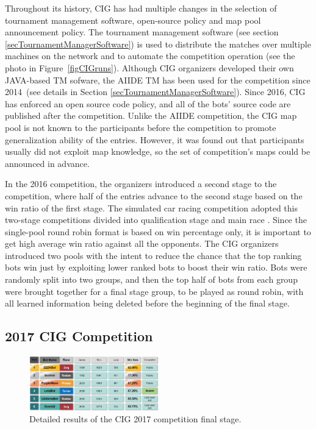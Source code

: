 Throughout its history, CIG has had multiple changes in the selection of tournament management software, open-source policy and map pool announcement policy. The tournament management software (see section \ref{secTournamentManagerSoftware}) is used to distribute the matches over multiple machines on the network and to automate the competition operation (see the photo in Figure~\ref{figCIGruns}). Although CIG organizers developed their own JAVA-based TM sofware, the AIIDE TM has been used for the competition since 2014~(see details in Section \ref{secTournamentManagerSoftware}). Since 2016, CIG has enforced an open source code policy, and all of the bots' source code are published after the competition. Unlike the AIIDE competition, the CIG map pool is not known to the participants before the competition to promote generalization ability of the entries. However, it was found out that participants usually did not exploit map knowledge, so the set of competition's maps could be announced in advance. 
 
In the 2016 competition, the organizers introduced a second stage to the competition, where half of the entries advance to the second stage based on the win ratio of the first stage. The simulated car racing competition adopted this two-stage competitions divided into qualification stage and main race \cite{loiacono20102009}. Since the single-pool round robin format is based on win percentage only, it is important to get high average win ratio against all the opponents. The CIG organizers introduced two pools with the intent to reduce the chance that the top ranking bots win just by exploiting lower ranked bots to boost their win ratio. Bots were randomly split into two groups, and then the top half of bots from each group were brought together for a final stage group, to be played as round robin, with all learned information being deleted before the beginning of the final stage. 

\subsection{2017 CIG Competition}\label{subsecCIGnews}

\begin{figure}[t]
  \centering
  \includegraphics[width=0.5\textwidth]{fig/cig-results.png}
  \caption{Detailed results of the CIG 2017 competition final stage.}
  \label{figCIGresults}
\end{figure}

